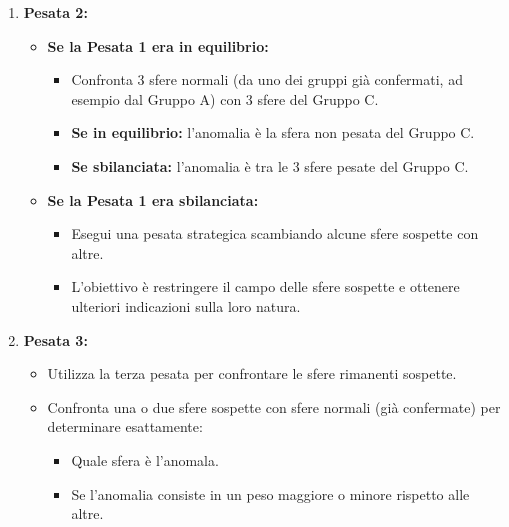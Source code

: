 \documentclass[a4paper,12pt]{article}
\begin{document}
\begin{enumerate}[label={}, leftmargin=2cm]
  \item \textbf{Pesata 2:}
  \begin{itemize}
    \item \textbf{Se la Pesata 1 era in equilibrio:}
      \begin{itemize}
        \item Confronta 3 sfere normali (da uno dei gruppi già confermati, ad esempio dal Gruppo A) con 3 sfere del Gruppo C.
        \item \textbf{Se in equilibrio:} l'anomalia è la sfera non pesata del Gruppo C.
        \item \textbf{Se sbilanciata:} l'anomalia è tra le 3 sfere pesate del Gruppo C.
      \end{itemize}
    \item \textbf{Se la Pesata 1 era sbilanciata:}
      \begin{itemize}
        \item Esegui una pesata strategica scambiando alcune sfere sospette con altre.
        \item L’obiettivo è restringere il campo delle sfere sospette e ottenere ulteriori indicazioni sulla loro natura.
      \end{itemize}
  \end{itemize}

  \item \textbf{Pesata 3:}
  \begin{itemize}
    \item Utilizza la terza pesata per confrontare le sfere rimanenti sospette.
    \item Confronta una o due sfere sospette con sfere normali (già confermate) per determinare esattamente:
      \begin{itemize}
        \item Quale sfera è l'anomala.
        \item Se l'anomalia consiste in un peso maggiore o minore rispetto alle altre.
      \end{itemize}
  \end{itemize}
\end{enumerate}
\end{document}
